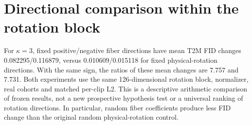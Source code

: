 \section{Directional comparison within the rotation block}
For $\kappa=3$, fixed positive/negative fiber directions have mean T2M FID changes 0.082295/0.116879, versus 0.010609/0.015118 for fixed physical-rotation directions. With the same sign, the ratios of these mean changes are 7.757 and 7.731. Both experiments use the same 126-dimensional rotation block, normalizer, real cohorts and matched per-clip L2. This is a descriptive arithmetic comparison of frozen results, not a new prospective hypothesis test or a universal ranking of rotation directions. In particular, random fiber coefficients produce less FID change than the original random physical-rotation control.
